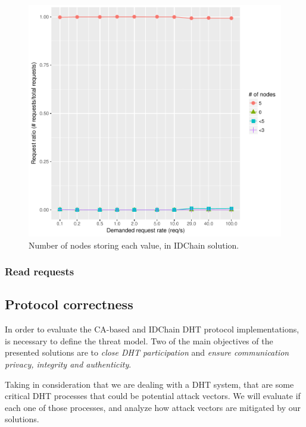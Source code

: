\begin{figure}[htb]
  \centering
  \includegraphics[scale=0.4]{Figures/evaluation/stored-ratio-https-bc.pdf}
  \caption{Number of nodes storing each value, in IDChain solution.}
\label{fig:stored-ratio-https-bc}
\end{figure}

\subsubsection{Read requests}

\subsection{Protocol correctness}
\label{section:protocol-correcteness}

In order to evaluate the CA-based and IDChain DHT protocol implementations, is necessary to define the threat model.
Two of the main objectives of the presented solutions are to \textit{close DHT participation} and \textit{ensure communication privacy, integrity and authenticity}.

Taking in consideration that we are dealing with a DHT system, that are some critical DHT processes that could be potential attack vectors.
We will evaluate if each one of those processes, and analyze how attack vectors are mitigated by our solutions.

